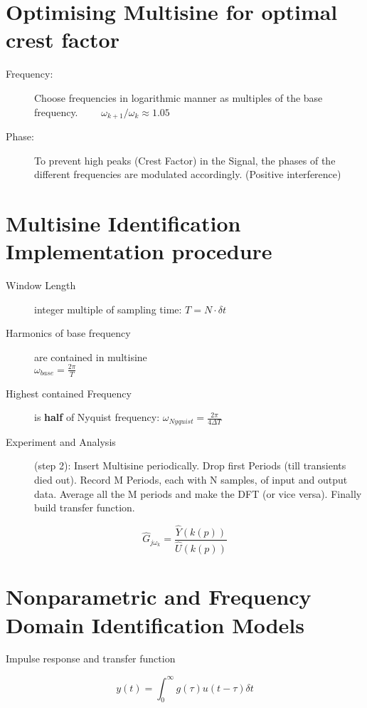 \section*{Optimising Multisine for optimal crest factor}
\begin{description}
\item[Frequency:] Choose frequencies in logarithmic manner as multiples of the base frequency. $\qquad \omega_{k+1}/\omega_{k} \approx 1.05$
\item[Phase:] To prevent high peaks (Crest Factor) in the Signal, the phases of the different frequencies are modulated accordingly. (Positive interference)
\end{description}


\section*{Multisine Identification Implementation procedure}
\begin{description}
\item[Window Length] integer multiple of sampling time:  \( T = N \cdot \delta t\)
\item[Harmonics of base frequency] are contained in multisine \\ \( {\omega}_{base} = \frac{2 \pi}{T}\)
\item[Highest contained Frequency] is \textbf{half} of Nyquist frequency: \( {\omega}_{Nyquist}  = \frac{2 \pi}{4 \Delta T}\)

\item[Experiment and Analysis] (step 2): Insert Multisine periodically. Drop first Periods (till transients died out). Record M Periods, each with N samples, of input and output data. Average all the M periods and make the DFT (or vice versa). Finally build transfer function.
\end{description}

\begin{equation*}
{\hat{G} _{j{\omega}_{k}}}=\frac{\hat{Y}(k(p))}{\hat{U}(k(p))}
\end{equation*}





\section*{Nonparametric and Frequency Domain Identification Models}
Impulse response and transfer function

\begin{equation*}
y(t)=\int _{ 0 }^{ \infty  }{ g(\tau)u(t-\tau) \delta t } 
\end{equation*}

